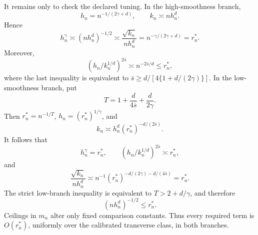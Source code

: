 It remains only to check the declared tuning. In the high-smoothness branch,
\[
 h_n=n^{-1/(2\gamma+d)},
 \qquad
 k_n\asymp nh_n^d.
\]
Hence
\[
 h_n^\gamma\asymp(nh_n^d)^{-1/2}
 \asymp\frac{\sqrt{k_n}}{nh_n^d}
 =n^{-\gamma/(2\gamma+d)}=r_n^*.
\]
Moreover,
\[
 (h_n/k_n^{1/d})^{2\bar s}\asymp n^{-2\bar s/d}\le r_n^*,
\]
where the last inequality is equivalent to
\(
\bar s\ge d/[4\{1+d/(2\gamma)\}].
\)
In the low-smoothness branch, put
\[
 T=1+\frac d{4\bar s}+\frac d{2\gamma}.
\]
Then \(r_n^*=n^{-1/T}\), \(h_n=(r_n^*)^{1/\gamma}\), and
\[
 k_n\asymp h_n^d(r_n^*)^{-d/(2\bar s)}.
\]
It follows that
\[
 h_n^\gamma=r_n^*,
 \qquad
 (h_n/k_n^{1/d})^{2\bar s}\asymp r_n^*,
\]
and
\[
 \frac{\sqrt{k_n}}{nh_n^d}
 \asymp n^{-1}(r_n^*)^{-d/(2\gamma)-d/(4\bar s)}
 =r_n^*.
\]
The strict low-branch inequality is equivalent to \(T>2+d/\gamma\), and therefore
\[
 (nh_n^d)^{-1/2}\le r_n^*.
\]
Ceilings in \(m_n\) alter only fixed comparison constants. Thus every required term is \(O(r_n^*)\), uniformly over the calibrated transverse class, in both branches.